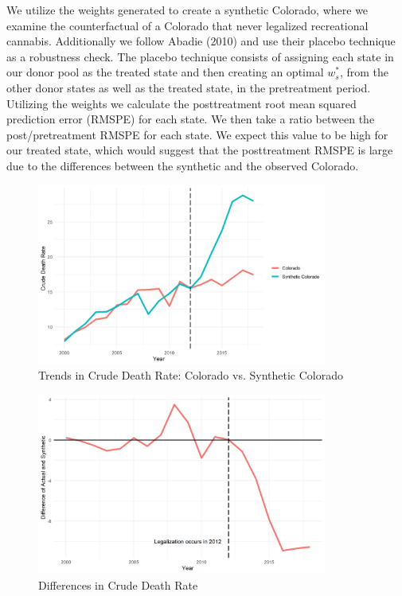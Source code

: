 \documentclass{article}
\begin{document}
We utilize the weights generated to create a synthetic Colorado, where we examine the counterfactual of a Colorado that never legalized recreational cannabis. Additionally we follow Abadie (2010) and use their placebo technique as a robustness check. The placebo technique consists of assigning each state in our donor pool as the treated state and then creating an optimal $w^{*}_s$, from the other donor states as well as the treated state, in the pretreatment period. Utilizing the weights we calculate the posttreatment root mean squared prediction error (RMSPE) for each state. We then take a ratio between the post/pretreatment RMSPE for each state. We expect this value to be high for our treated state, which would suggest that the posttreatment RMSPE is large due to the differences between the synthetic and the observed Colorado.





\begin{figure}[H]
	\begin{center}
		\includegraphics[width=0.85\textwidth]{trends_plot_colorado}
	\end{center}
	\caption{Trends in Crude Death Rate: Colorado vs. Synthetic Colorado}
	\label{fig:trends_plot_colorado}
\end{figure}

\begin{figure}[H]
	\begin{center}
		\includegraphics[width=0.85\textwidth]{diffs_plot_colorado}
	\end{center}
	\caption{Differences in Crude Death Rate}
	\label{fig:diffs_plot_colorado}
\end{figure}
\end{document}
